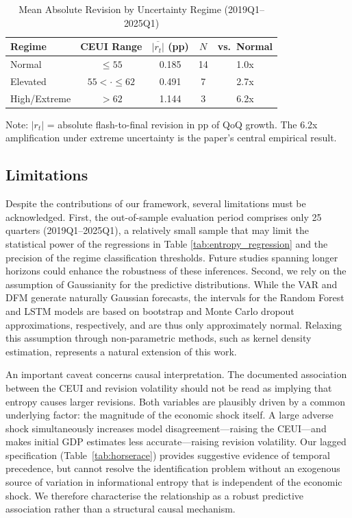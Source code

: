 \documentclass[12pt,a4paper]{article}
\theoremstyle{remark}
\begin{document}
\begin{table}[t]
\centering
\begin{threeparttable}
\caption{Mean Absolute Revision by Uncertainty Regime (2019Q1--2025Q1)}
\label{tab:regime_revisions}
\begin{tabular}{lcccc}
\toprule
Regime & CEUI Range & $\overline{|r_t|}$ (pp) & $N$ & vs.\ Normal \\
\midrule
Normal    & $\leq 55$        & 0.185 & 14 & 1.0x \\
Elevated  & $55 < \cdot \leq 62$ & 0.491 & 7   & 2.7x \\
High/Extreme & $> 62$       & 1.144 & 3  & 6.2x \\
\bottomrule
\end{tabular}
\begin{tablenotes}
  \small \item Note: $|r_t|$ = absolute flash-to-final revision in pp of QoQ growth.
  The 6.2x amplification under extreme uncertainty is the paper's central empirical result.
\end{tablenotes}
\end{threeparttable}
\end{table}


\subsection{Limitations}

Despite the contributions of our framework, several limitations must be acknowledged. First, the out-of-sample evaluation period comprises only 25 quarters (2019Q1--2025Q1), a relatively small sample that may limit the statistical power of the regressions in Table \ref{tab:entropy_regression} and the precision of the regime classification thresholds. Future studies spanning longer horizons could enhance the robustness of these inferences. Second, we rely on the assumption of Gaussianity for the predictive distributions. While the VAR and DFM generate naturally Gaussian forecasts, the intervals for the Random Forest and LSTM models are based on bootstrap and Monte Carlo dropout approximations, respectively, and are thus only approximately normal. Relaxing this assumption through non-parametric methods, such as kernel density estimation, represents a natural extension of this work.

An important caveat concerns causal interpretation. The documented association between the CEUI and revision volatility should not be read as implying that entropy causes larger revisions. Both variables are plausibly driven by a common underlying factor: the magnitude of the economic shock itself. A large adverse shock simultaneously increases model disagreement---raising the CEUI---and makes initial GDP estimates less accurate---raising revision volatility. Our lagged specification (Table~\ref{tab:horserace}) provides suggestive evidence of temporal precedence, but cannot resolve the identification problem without an exogenous source of variation in informational entropy that is independent of the economic shock. We therefore characterise the relationship as a robust predictive association rather than a structural causal mechanism.
\end{document}
